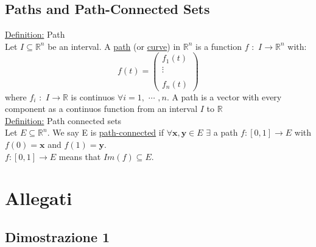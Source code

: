 \documentclass[a4paper,11pt]{article}
\newcommand{\icol}[1]{%
  \left(\begin{smallmatrix}#1\end{smallmatrix}\right)%
}
\newcommand{\rn}{
  \mathbb{R}^n
}
\newcommand{\R}{
  \mathbb{R}
}
\begin{document}
\subsection{Paths and Path-Connected Sets}
\underline{Definition:} Path \\
Let $ I \subseteq \rn $ be an interval. A \underline{path} (or \underline{curve}) in $\rn$ is a function $ f \, \, : \, \, I \to \rn $ with:
$$ f(t) = \icol{f_1(t) \\ \vdots \\ \\ f_n(t)} $$
where  $ f_i \, \, : \, \, I \to \R $ is continuos $ \forall i = 1 , \, \, \cdots  \, \, , n $. A path is a vector with every component as a continuos function from an interval $I$ to $\R$ \\
\underline{Definition:} Path connected sets\\
Let $E \subseteq \rn $. We say E is \underline{path-connected} if $\forall \mathbf{x,y} \in E \, \, \exists $ a path  $f : [0,1] \to E $ with $f(0) = \mathbf{x} $ and $f(1) = \mathbf{y} $. \\
$f : [0,1] \to E $ means that $ Im(f) \subseteq E $.






\pagebreak



\section{Allegati}
\label{sec:allegati}
\subsection{Dimostrazione 1}
\label{sec:Dimostrazione 1}
\end{document}
